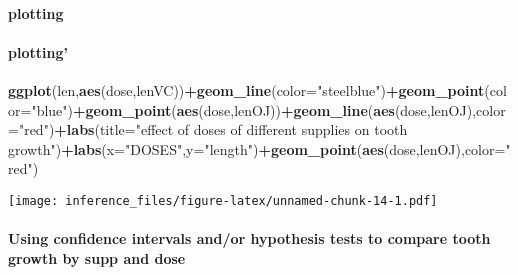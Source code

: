 \documentclass[]{article}
\newenvironment{Shaded}{\begin{snugshade}}{\end{snugshade}}
\newcommand{\KeywordTok}[1]{\textcolor[rgb]{0.13,0.29,0.53}{\textbf{#1}}}
\newcommand{\DataTypeTok}[1]{\textcolor[rgb]{0.13,0.29,0.53}{#1}}
\newcommand{\StringTok}[1]{\textcolor[rgb]{0.31,0.60,0.02}{#1}}
\newcommand{\OperatorTok}[1]{\textcolor[rgb]{0.81,0.36,0.00}{\textbf{#1}}}
\newcommand{\NormalTok}[1]{#1}
\let\oldparagraph\paragraph
\renewcommand{\paragraph}[1]{\oldparagraph{#1}\mbox{}}
\begin{document}
\paragraph{plotting}\label{plotting}

\begin{Shaded}
\end{Shaded}

\paragraph{plotting'}\label{plotting-1}

\begin{Shaded}
\begin{Highlighting}[]
\KeywordTok{ggplot}\NormalTok{(len,}\KeywordTok{aes}\NormalTok{(dose,lenVC))}\OperatorTok{+}\KeywordTok{geom_line}\NormalTok{(}\DataTypeTok{color=}\StringTok{"steelblue"}\NormalTok{)}\OperatorTok{+}\KeywordTok{geom_point}\NormalTok{(}\DataTypeTok{color=}\StringTok{"blue"}\NormalTok{)}\OperatorTok{+}\KeywordTok{geom_point}\NormalTok{(}\KeywordTok{aes}\NormalTok{(dose,lenOJ))}\OperatorTok{+}\KeywordTok{geom_line}\NormalTok{(}\KeywordTok{aes}\NormalTok{(dose,lenOJ),}\DataTypeTok{color=}\StringTok{"red"}\NormalTok{)}\OperatorTok{+}\KeywordTok{labs}\NormalTok{(}\DataTypeTok{title=}\StringTok{"effect of doses of different supplies on tooth growth"}\NormalTok{)}\OperatorTok{+}\KeywordTok{labs}\NormalTok{(}\DataTypeTok{x=}\StringTok{"DOSES"}\NormalTok{,}\DataTypeTok{y=}\StringTok{"length"}\NormalTok{)}\OperatorTok{+}\KeywordTok{geom_point}\NormalTok{(}\KeywordTok{aes}\NormalTok{(dose,lenOJ),}\DataTypeTok{color=}\StringTok{"red"}\NormalTok{)}
\end{Highlighting}
\end{Shaded}

\texttt{[image: inference\_files/figure-latex/unnamed-chunk-14-1.pdf]}

\paragraph{Using confidence intervals and/or hypothesis tests to compare
tooth growth by supp and
dose}\label{using-confidence-intervals-andor-hypothesis-tests-to-compare-tooth-growth-by-supp-and-dose}
\end{document}
